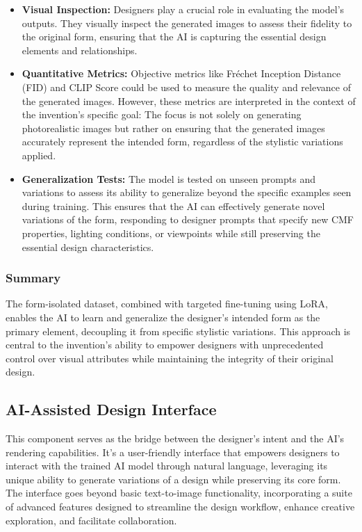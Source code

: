 \documentclass{article}
\begin{document}
\begin{itemize}
    \item \textbf{Visual Inspection:} Designers play a crucial role in evaluating the model's outputs. They visually inspect the generated images to assess their fidelity to the original form, ensuring that the AI is capturing the essential design elements and relationships.
    \item \textbf{Quantitative Metrics:} Objective metrics like Fréchet Inception Distance (FID) and CLIP Score could be used to measure the quality and relevance of the generated images. However, these metrics are interpreted in the context of the invention's specific goal: The focus is not solely on generating photorealistic images but rather on ensuring that the generated images accurately represent the intended form, regardless of the stylistic variations applied.
    \item \textbf{Generalization Tests:} The model is tested on unseen prompts and variations to assess its ability to generalize beyond the specific examples seen during training. This ensures that the AI can effectively generate novel variations of the form, responding to designer prompts that specify new CMF properties, lighting conditions, or viewpoints while still preserving the essential design characteristics.
\end{itemize}

\subsubsection{Summary}
The form-isolated dataset, combined with targeted fine-tuning using LoRA, enables the AI to learn and generalize the designer's intended form as the primary element, decoupling it from specific stylistic variations. This approach is central to the invention's ability to empower designers with unprecedented control over visual attributes while maintaining the integrity of their original design.

\subsection{AI-Assisted Design Interface}

This component serves as the bridge between the designer's intent and the AI's rendering capabilities. It's a user-friendly interface that empowers designers to interact with the trained AI model through natural language, leveraging its unique ability to generate variations of a design while preserving its core form. The interface goes beyond basic text-to-image functionality, incorporating a suite of advanced features designed to streamline the design workflow, enhance creative exploration, and facilitate collaboration.
\end{document}

